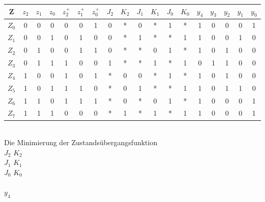 \documentclass[11pt,a4paper]{article}
\begin{document}
\begin{tabular}{ c | c | c | c | | c | c | c | | c | c | c | c | c | c | | c | c | c | c | c}
Z&$z_2$&$z_1$&$z_0$&$z^+_2$&$z^+_1$&$z^+_0$&$J_2$&$K_2$&$J_1$&$K_1$&$J_0$&$K_0$&$y_4$&$y_3$&$y_2$&$y_1$&$y_0$ \\ \hline
$Z_0$&0&0&0&0&0&1&0&*&0&*&1&*&1&0&0&0&1\\
$Z_1$&0&0&1&0&1&0&0&*&1&*&*&1&1&0&0&1&0\\
$Z_2$&0&1&0&0&1&1&0&*&*&0&1&*&1&0&1&0&0\\
$Z_3$&0&1&1&1&0&0&1&*&*&1&*&1&0&1&1&0&0\\
$Z_4$&1&0&0&1&0&1&*&0&0&*&1&*&1&0&1&0&0\\
$Z_5$&1&0&1&1&1&0&*&0&1&*&*&1&1&0&1&1&0\\
$Z_6$&1&1&0&1&1&1&*&0&*&0&1&*&1&0&0&0&1\\
$Z_7$&1&1&1&0&0&0&*&1&*&1&*&1&1&0&0&0&1\\ \hline
\end{tabular}\\
Die Minimierung der Zustandsübergangsfunktion \\
$J_2$ 
 $K_2$
\\
$J_1$
$K_1$
\\
$J_0$
$K_0$
\\ \\
$y_4$
\end{document}
